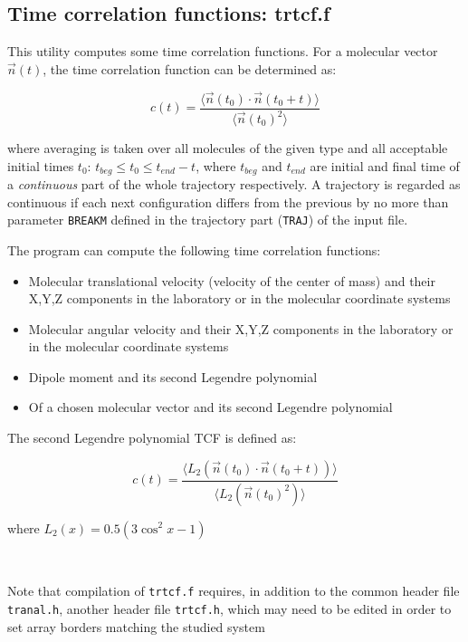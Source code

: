 \documentclass{article}
\begin{document}
\subsection{Time correlation functions:  trtcf.f}

This utility computes some time correlation functions. For a molecular 
vector $\vec{n}(t)$, the time correlation function can be determined as:

\begin{equation}
\label{TCF}
c(t) = \frac{\langle\vec{n}(t_0)\cdot\vec{n}(t_0+t)\rangle}
{\langle\vec{n}(t_0)^2\rangle}
\end{equation}

\noindent
where averaging is taken over all molecules of the given type and all
acceptable initial times $t_0$:   $t_{beg} \le t_0 \le t_{end}-t$, where
$t_{beg}$ and $t_{end}$ are initial and final time of a {\it continuous}
part of the whole trajectory respectively. A trajectory is regarded as 
continuous if each next configuration differs from the previous by no more
than parameter \verb|BREAKM| defined in the trajectory part (\verb|TRAJ|)
of the input file.

The program can compute the following time correlation functions:

\begin{itemize}
\item
Molecular translational velocity (velocity of the center of mass) and
their X,Y,Z components in the laboratory or in the molecular coordinate systems
\item
Molecular angular velocity and
their X,Y,Z components in the laboratory or in the molecular coordinate systems
\item
Dipole moment and its second Legendre polynomial
\item
Of a chosen molecular vector and its second Legendre polynomial
\end{itemize}

The second Legendre polynomial TCF is defined as:

\begin{equation}
\label{TCF-L2}
c(t) = \frac{\langle L_2(\vec{n}(t_0)\cdot\vec{n}(t_0+t))\rangle}
{\langle L_2(\vec{n}(t_0)^2)\rangle}
\end{equation}

where $L_2(x) = 0.5(3\cos^2 x -1)$ 

\verb| |

Note that compilation of \verb|trtcf.f| requires, in addition to
the common header file \verb|tranal.h|, another header file \verb|trtcf.h|,
which may need to be edited in order to set array borders matching the 
studied system
\end{document}
